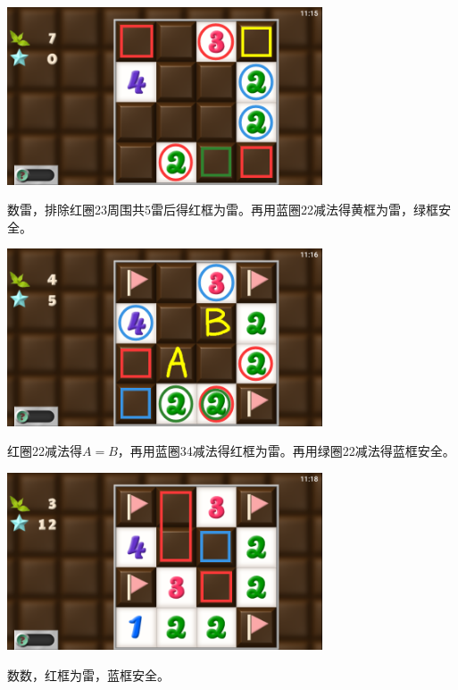 \subsection{} %
\begin{center}
    \includegraphics[width=0.7\textwidth]{puzzle/129-1.png}
\end{center}
数雷，排除红圈23周围共5雷后得红框为雷。再用蓝圈22减法得黄框为雷，绿框安全。
\begin{center}
    \includegraphics[width=0.7\textwidth]{puzzle/129-2.png}
\end{center}
红圈22减法得$A=B$，再用蓝圈34减法得红框为雷。再用绿圈22减法得蓝框安全。
\begin{center}
    \includegraphics[width=0.7\textwidth]{puzzle/129-3.png}
\end{center}
数数，红框为雷，蓝框安全。

